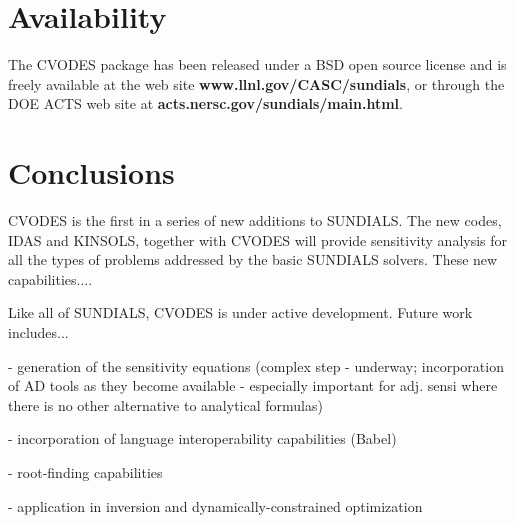 \section{Availability}\label{s:availability}

The CVODES package has been released under a BSD open source license and is 
freely available at the web site
{\bf www.llnl.gov/CASC/sundials},
or through the DOE ACTS web site at
{\bf acts.nersc.gov/sundials/main.html}.

\section{Conclusions}\label{s:conclusions}

CVODES is the first in a series of new additions to SUNDIALS. The new codes,
IDAS and KINSOLS, together with CVODES will provide sensitivity analysis
for all the types of problems addressed by the basic SUNDIALS solvers.
These new capabilities....


Like all of SUNDIALS, CVODES is under active development. Future work includes...

- generation of the sensitivity equations (complex step - underway; incorporation
of AD tools as they become available - especially important for adj. sensi where
there is no other alternative to analytical formulas)

- incorporation of language interoperability capabilities (Babel)

- root-finding capabilities

- application in inversion and dynamically-constrained optimization